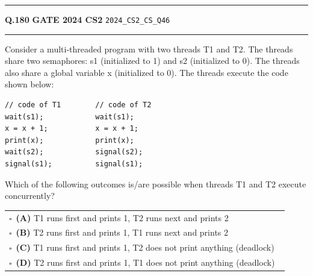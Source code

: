 \documentclass[a4paper,10pt]{article}
\begin{document}
\vspace{6pt}\hrule height 0.35pt\vspace{6pt}
\noindent
\begin{tcolorbox}[
    blanker,
    sidebyside,
    sidebyside align=top,
    lefthand width=0.55\textwidth,
    top=4pt, bottom=4pt, left=0pt, right=0pt,
    middle=16pt,
    underlay={
        \draw[dashed, black!80, line width=0.8pt, dash pattern=on 4pt off 3pt]
            ([xshift=0.55\textwidth+8pt]frame.north west) --
            ([xshift=0.55\textwidth+8pt]frame.south west);
    }
]
\textbf{Q.180}  \hfill {\footnotesize\textbf{GATE 2024 CS2} \quad \tiny\texttt{2024\_CS2\_CS\_Q46}}
\vspace{2pt}\hrule height 0.3pt\vspace{4pt}

Consider a multi-threaded program with two threads T1 and T2. The threads share two semaphores: s1 (initialized to 1) and s2 (initialized to 0). The threads also share a global variable x (initialized to 0). The threads execute the code shown below:
\begin{verbatim}
// code of T1        // code of T2
wait(s1);            wait(s1);
x = x + 1;           x = x + 1;
print(x);            print(x);
wait(s2);            signal(s2);
signal(s1);          signal(s1);
\end{verbatim}
Which of the following outcomes is/are possible when threads T1 and T2 execute concurrently?

\par\vspace{6pt}\noindent
\begin{tabular}{@{}p{0.98\linewidth}@{}}
$\square$\ \textbf{(A)} T1 runs first and prints 1, T2 runs next and prints 2 \\
\addlinespace[3pt]
$\square$\ \textbf{(B)} T2 runs first and prints 1, T1 runs next and prints 2 \\
\addlinespace[3pt]
$\square$\ \textbf{(C)} T1 runs first and prints 1, T2 does not print anything (deadlock) \\
\addlinespace[3pt]
$\square$\ \textbf{(D)} T2 runs first and prints 1, T1 does not print anything (deadlock)
\end{tabular}

\tcblower


\end{tcolorbox}
\end{document}
